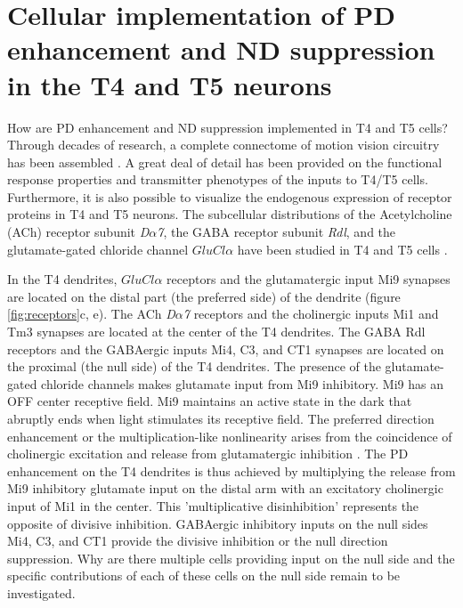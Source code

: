 \section{Cellular implementation of PD enhancement and ND suppression in the T4 and T5 neurons}
How are PD enhancement and ND suppression implemented in T4 and T5 cells?  Through decades of research, a complete connectome of motion vision circuitry has been assembled \parencite{Takemura2008, Takemura2017, Shinomiya2014, Shinomiya2019}. A great deal of detail has been provided on the functional response properties \parencite{Arenz2017, Drews2020, Strother2017, Serbe2016} and transmitter phenotypes \parencite{Davis2020, Pankova2017, Richter2018, Takemura2017} of the inputs to T4/T5 cells. Furthermore, it is also possible to visualize the endogenous expression of receptor proteins in T4 and T5 neurons. The subcellular distributions of the Acetylcholine (ACh) receptor subunit \textit{D$\alpha$7}, the GABA receptor subunit \textit{Rdl}, and the glutamate-gated chloride channel \textit{$GluCl\alpha$} have been studied in T4 and T5 cells \parencite{Fendl2020}.

In the T4 dendrites, \textit{$GluCl\alpha$} receptors and the glutamatergic input Mi9 synapses are located on the distal part (the preferred side) of the dendrite (figure \ref{fig:receptors}c, e). The ACh \textit{D$\alpha$7} receptors and the cholinergic inputs Mi1 and Tm3 synapses are located at the center of the T4 dendrites. The GABA Rdl receptors and the GABAergic inputs Mi4, C3, and CT1 synapses are located on the proximal (the null side) of the T4 dendrites. The presence of the glutamate-gated chloride channels makes glutamate input from Mi9 inhibitory. Mi9 has an OFF center receptive field. Mi9 maintains an active state in the dark that abruptly ends when light stimulates its receptive field. The preferred direction enhancement or the multiplication-like nonlinearity arises from the coincidence of cholinergic excitation and release from glutamatergic inhibition \parencite{Groschner2022}. The PD enhancement on the T4 dendrites is thus achieved by multiplying the release from Mi9 inhibitory glutamate input on the distal arm with an excitatory cholinergic input of Mi1 in the center. This 'multiplicative disinhibition' represents the opposite of divisive inhibition. GABAergic inhibitory inputs on the null sides Mi4, C3, and CT1 provide the divisive inhibition or the null direction suppression. Why are there multiple cells providing input on the null side and the specific contributions of each of these cells on the null side remain to be investigated.

